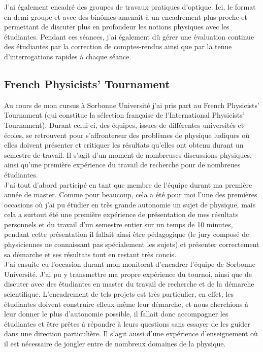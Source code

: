 \documentclass[a4paper,11pt]{article} %
\newcommand{\pointmedian}{\fontfamily{cmr}\selectfont\textperiodcentered}
\begin{document}
	J'ai également encadré des groupes de travaux pratiques d'optique. Ici, le format en demi-groupe et avec des binômes amenait à un encadrement plus proche et permettant de discuter plus en profondeur les notions physiques avec les étudiant\pointmedian es. Pendant ces séances, j'ai également dû gérer une évaluation continue des étudiant\pointmedian es par la correction de comptes-rendus ainsi que par la tenue d'interrogations rapides à chaque séance.\\
	
	\subsection{French Physicists' Tournament}
	Au cours de mon cursus à Sorbonne Université j'ai pris part au French Physicists' Tournament (qui constitue la sélection française de l'International Physicists' Tournament). Durant celui-ci, des équipes, issues de différentes universités et écoles, se retrouvent pour \textgravedbl s'affronter\textacutedbl  sur des problèmes de physique ludiques où elles doivent présenter et critiquer les résultats qu'elles ont obtenu durant un semestre de travail. Il s'agit d'un moment de nombreuses discussions physiques, ainsi qu'une première expérience du travail de recherche pour de nombreu\pointmedian es étudiant\pointmedian es.\\
	
	J'ai tout d'abord participé en tant que membre de l'équipe durant ma première année de master. Comme pour beaucoup, cela a été pour moi l'une des premières occasions où j'ai pu étudier en très grande autonomie un sujet de physique, mais cela a surtout été une première expérience de présentation de mes résultats personnels et du travail d'un semestre entier sur un temps de 10 minutes, pendant cette présentation il fallait ainsi être pédagogique (le jury composé de physicien\pointmedian nes ne connaissant pas spécialement les sujets) et présenter correctement sa démarche et ses résultats tout en restant très concis.\\
	
	J'ai ensuite eu l'occasion durant mon monitorat d'encadrer l'équipe de Sorbonne Université. J'ai pu y transmettre ma propre expérience du tournoi, ainsi que de discuter avec des étudiant\pointmedian es en master du travail de recherche et de la démarche scientifique. L'encadrement de tels projets est très particulier, en effet, les étudiant\pointmedian es doivent construire elleux-même leur démarche, et nous cherchions à leur donner le plus d'autonomie possible, il fallait donc accompagner les étudiant\pointmedian es et être prêt\pointmedian es à répondre à leurs questions sans essayer de les guider dans une direction particulière. Il s'agit aussi d'une expérience d'enseignement où il est nécessaire de jongler entre de nombreux domaines de la physique.\\
	
\end{document}
